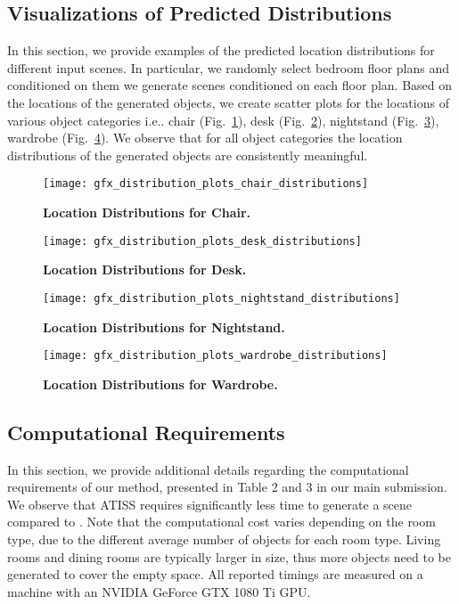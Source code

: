 \documentclass{article}
\makeatletter
\DeclareRobustCommand\onedot{\futurelet\@let@token\@onedot}
\def\@onedot{\ifx\@let@token.\else.\null\fi\xspace}
\def\ie{i.e\onedot} \def\Ie{I.e\onedot}
\newcommand{\figref}[1]{Fig.~\ref{#1}}
\makeatother
\begin{document}
\subsection{Visualizations of Predicted Distributions}

In this section, we provide examples of the predicted location distributions for
different input scenes. In particular, we randomly select  bedroom floor plans and
conditioned on them we generate  scenes conditioned on each floor plan. Based on the locations of the generated objects, 
we create scatter plots for the locations of various object categories \ie chair
(\figref{fig:chair_location_distributions}), desk
(\figref{fig:desk_location_distributions}), nightstand
(\figref{fig:nightstand_location_distributions}), wardrobe
(\figref{fig:wardrobe_location_distributions}). We observe that for all object
categories the location distributions of the generated objects are consistently
meaningful.
\begin{figure}
    \centering
     \texttt{[image: gfx\_distribution\_plots\_chair\_distributions]}
     \caption{\textbf{Location Distributions for Chair.}}
     \label{fig:chair_location_distributions}
\end{figure}
\begin{figure}
    \centering
     \texttt{[image: gfx\_distribution\_plots\_desk\_distributions]}
     \caption{\textbf{Location Distributions for Desk.}}
     \label{fig:desk_location_distributions}
\end{figure}
\begin{figure}
    \centering
     \texttt{[image: gfx\_distribution\_plots\_nightstand\_distributions]}
     \caption{\textbf{Location Distributions for Nightstand.}}
     \label{fig:nightstand_location_distributions}
\end{figure}
\begin{figure}
    \centering
     \texttt{[image: gfx\_distribution\_plots\_wardrobe\_distributions]}
     \caption{\textbf{Location Distributions for Wardrobe.}}
     \label{fig:wardrobe_location_distributions}
\end{figure}

\subsection{Computational Requirements}

In this section, we provide additional details regarding the computational
requirements of our method, presented in Table 2 and 3 in our main submission.
We observe that ATISS requires significantly less time to generate a scene 
compared to \cite{Wang2020ARXIV, Ritchie2019CVPR}. Note that the computational
cost varies depending on the room type, due to the different average number of
objects for each room type. Living rooms and dining rooms are typically larger
in size, thus more objects need to be generated to cover the empty space. All
reported timings are measured on a machine with an NVIDIA GeForce GTX 1080 Ti
GPU.
\end{document}
